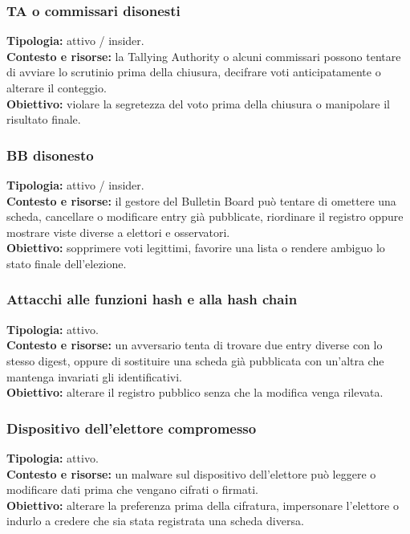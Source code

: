 \documentclass[12pt,a4paper]{article}
\begin{document}
\subsubsection*{TA o commissari disonesti}
\textbf{Tipologia:} attivo / insider.\\
\textbf{Contesto e risorse:} la Tallying Authority o alcuni commissari possono tentare di avviare lo scrutinio prima della chiusura, decifrare voti anticipatamente o alterare il conteggio.\\
\textbf{Obiettivo:} violare la segretezza del voto prima della chiusura o manipolare il risultato finale.\\


\subsubsection*{BB disonesto}
\textbf{Tipologia:} attivo / insider.\\
\textbf{Contesto e risorse:} il gestore del Bulletin Board pu\`o tentare di omettere una scheda, cancellare o modificare entry gi\`a pubblicate, riordinare il registro oppure mostrare viste diverse a elettori e osservatori.\\
\textbf{Obiettivo:} sopprimere voti legittimi, favorire una lista o rendere ambiguo lo stato finale dell'elezione.\\


\subsubsection*{Attacchi alle funzioni hash e alla hash chain}
\textbf{Tipologia:} attivo.\\
\textbf{Contesto e risorse:} un avversario tenta di trovare due entry diverse con lo stesso digest, oppure di sostituire una scheda gi\`a pubblicata con un'altra che mantenga invariati gli identificativi.\\
\textbf{Obiettivo:} alterare il registro pubblico senza che la modifica venga rilevata.\\


\subsubsection*{Dispositivo dell'elettore compromesso}
\textbf{Tipologia:} attivo.\\
\textbf{Contesto e risorse:} un malware sul dispositivo dell'elettore pu\`o leggere o modificare dati prima che vengano cifrati o firmati.\\
\textbf{Obiettivo:} alterare la preferenza prima della cifratura, impersonare l'elettore o indurlo a credere che sia stata registrata una scheda diversa.\\
\end{document}
